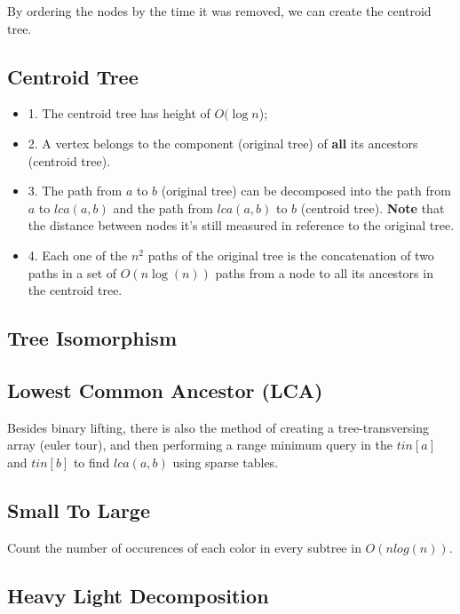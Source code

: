 By ordering the nodes by the time it was removed, we can create the centroid tree.

\subsection{Centroid Tree}

\vspace{5pt}

\begin{itemize}
	\item 1. The centroid tree has height of $O(\log{n}$);

	\item 2. A vertex belongs to the component (original tree) of \textbf{all} its ancestors (centroid tree).
	
	\item 3. The path from $a$ to $b$ (original tree) can be decomposed into the path from $a$ to $lca(a,b)$ 
	and the path from $lca(a,b)$ to $b$ (centroid tree).
	\textbf{Note} that the distance between nodes it's still measured in reference to the original tree.
	
	\item 4. Each one of the $n^2$ paths of the original tree is the concatenation of 
	two paths in a set of $O(n \log(n))$ paths from a node to all its ancestors in the 
	centroid tree.
\end{itemize}


\subsection{Tree Isomorphism}

\vspace{10pt}


\subsection{Lowest Common Ancestor (LCA)}
	Besides binary lifting, there is also the method of creating a tree-transversing array (euler tour),
	and then performing a range minimum query in the $tin[a]$ and $tin[b]$ to find $lca(a, b)$ using sparse tables.



\subsection{Small To Large}

	Count the number of occurences of each color in every subtree in $O(n log(n))$.


\subsection{Heavy Light Decomposition}

